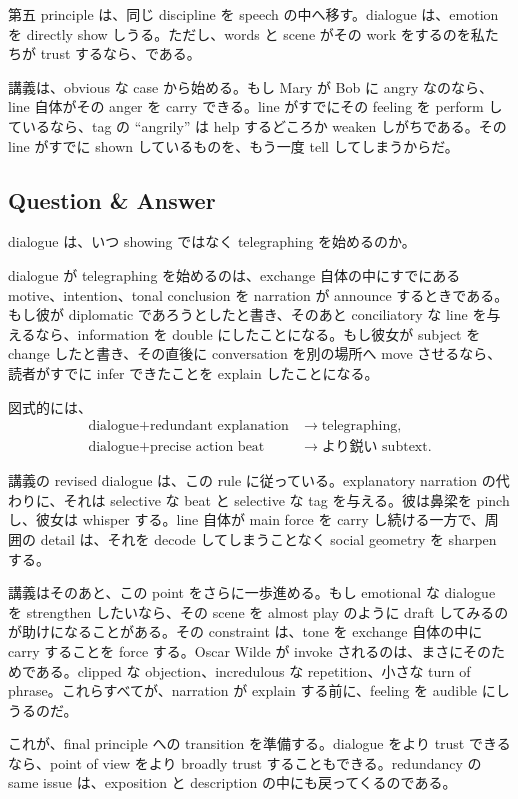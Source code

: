 第五 principle は、同じ discipline を speech の中へ移す。dialogue は、emotion を directly show しうる。ただし、words と scene がその work をするのを私たちが trust するなら、である。

講義は、obvious な case から始める。もし Mary が Bob に angry なのなら、line 自体がその anger を carry できる。line がすでにその feeling を perform しているなら、tag の ``angrily'' は help するどころか weaken しがちである。その line がすでに shown しているものを、もう一度 tell してしまうからだ。

\subsection{Question \& Answer}

dialogue は、いつ showing ではなく telegraphing を始めるのか。

dialogue が telegraphing を始めるのは、exchange 自体の中にすでにある motive、intention、tonal conclusion を narration が announce するときである。もし彼が diplomatic であろうとしたと書き、そのあと conciliatory な line を与えるなら、information を double にしたことになる。もし彼女が subject を change したと書き、その直後に conversation を別の場所へ move させるなら、読者がすでに infer できたことを explain したことになる。

図式的には、
\begin{align}
\text{dialogue} + \text{redundant explanation}
&\to \text{telegraphing},\\
\text{dialogue} + \text{precise action beat}
&\to \text{より鋭い subtext}.
\end{align}

講義の revised dialogue は、この rule に従っている。explanatory narration の代わりに、それは selective な beat と selective な tag を与える。彼は鼻梁を pinch し、彼女は whisper する。line 自体が main force を carry し続ける一方で、周囲の detail は、それを decode してしまうことなく social geometry を sharpen する。

講義はそのあと、この point をさらに一歩進める。もし emotional な dialogue を strengthen したいなら、その scene を almost play のように draft してみるのが助けになることがある。その constraint は、tone を exchange 自体の中に carry することを force する。Oscar Wilde が invoke されるのは、まさにそのためである。clipped な objection、incredulous な repetition、小さな turn of phrase。これらすべてが、narration が explain する前に、feeling を audible にしうるのだ。

これが、final principle への transition を準備する。dialogue をより trust できるなら、point of view をより broadly trust することもできる。redundancy の same issue は、exposition と description の中にも戻ってくるのである。

